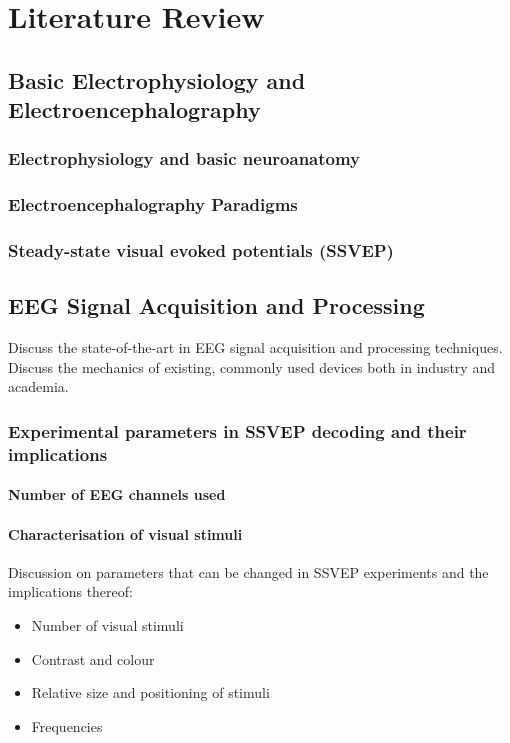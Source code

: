 \chapter{Literature Review}

\graphicspath{ {report/Chapter2/assets/} } 

\section{Basic Electrophysiology and Electroencephalography}

\subsection{Electrophysiology and basic neuroanatomy}

\subsection{Electroencephalography Paradigms}

\subsection{Steady-state visual evoked potentials (SSVEP)}

\section{EEG Signal Acquisition and Processing}
Discuss the state-of-the-art in EEG signal acquisition and processing techniques. Discuss the mechanics of existing, commonly used devices both in industry and academia.
\subsection{Experimental parameters in SSVEP decoding and their implications}
\subsubsection{Number of EEG channels used}
\subsubsection{Characterisation of visual stimuli}
Discussion on parameters that can be changed in SSVEP experiments and the implications thereof:
\begin{itemize}
    \item Number of visual stimuli
    \item Contrast and colour
    \item Relative size and positioning of stimuli
    \item Frequencies
\end{itemize}

